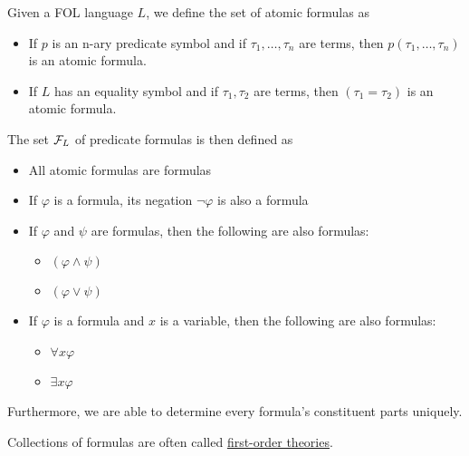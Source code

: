\begin{definition}\label{def:first_order_formula}\cite[definition 2.5]{Nerode2012}
  Given a FOL language $L$, we define the set of atomic formulas as
  \begin{itemize}
    \item If $p$ is an n-ary predicate symbol and if $\tau_1, \ldots, \tau_n$ are terms, then $p(\tau_1, \ldots, \tau_n)$ is an atomic formula.
    \item If $L$ has an equality symbol and if $\tau_1, \tau_2$ are terms, then $(\tau_1 = \tau_2)$ is an atomic formula.
  \end{itemize}

  The set $\mathcal F_L$ of predicate formulas is then defined as
  \begin{itemize}
    \item All atomic formulas are formulas
    \item If $\varphi$ is a formula, its negation $\neg \varphi$ is also a formula
    \item If $\varphi$ and $\psi$ are formulas, then the following are also formulas:
    \begin{itemize}
      \item $(\varphi \land \psi)$
      \item $(\varphi \lor \psi)$
    \end{itemize}
    \item If $\varphi$ is a formula and $x$ is a variable, then the following are also formulas:
    \begin{itemize}
      \item $\forall x \varphi$
      \item $\exists x \varphi$
    \end{itemize}
  \end{itemize}

  Furthermore, we are able to determine every formula's constituent parts uniquely.

  Collections of formulas are often called \uline{first-order theories}.


\end{definition}
